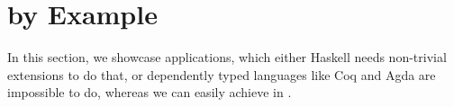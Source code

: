 \visiblecomments

\newlength{\blanklineskip}
\setlength{\blanklineskip}{0.66084ex}

\newcommand{\hsindent}[1]{\quad}%
\let\hspre\empty
\let\hspost\empty
\newcommand{\NB}{\textbf{NB}}
\newcommand{\Todo}[1]{$\langle$\textbf{To do:}~#1$\rangle$}

\EndFmtInput
\makeatother
%



\section{\name by Example}
\label{sec:app}

In this section, we showcase applications, which either Haskell needs non-trivial extensions to do that, or dependently typed languages like Coq and Agda are impossible to do, whereas we can easily achieve in \name.

